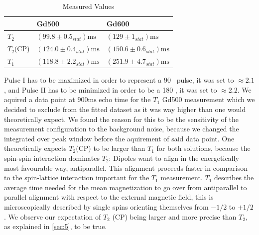 \begin{table}[h]
	\centering
	\begin{tabular}{lll}
		\toprule
		 & Gd500 & Gd600 \\
		\midrule
		$T_2$ & $\left(99.8 \pm 0.5_{stat}\right)\mathrm{ms}$ & $\left(129 \pm 1_{stat}\right)\mathrm{ms}$\\
		
		$T_2$(CP) & $\left(124.0 \pm 0.4_{stat}\right)\mathrm{ms}$ & $\left(150.6 \pm 0.6_{stat}\right)\mathrm{ms}$\\
		
		$T_1$   & $\left(118.8 \pm 2.2_{stat}\right)\mathrm{ms}$ &$ \left(251.9 \pm 4.7_{stat}\right)\mathrm{ms}$\\
		
		\bottomrule
	\end{tabular}
	\caption{Measured Values}
	\label{tab:1}
\end{table}
\noindent
Pulse I has to be maximized in order to represent a 90 \textdegree\, pulse, it was set to $\approx 2.1$, and Pulse II has to be minimized in order to be a 180 \textdegree, it was set to $\approx 2.2$.
We aquired a data point at $900 \mathrm{ms}$ echo time for the $T_1$ Gd500 measurement which we decided to exclude from the fitted dataset as it was way higher than one would theoretically expect. We found the reason for this to be the sensitivity of the measurement configuration to the background noise, because we changed the integrated over peak window before the aquirement of said data point.
One theoretically expects $T_2$(CP) to be larger than $T_1$ for both solutions,
because the spin-spin interaction dominates $T_2$: Dipoles want to align in the energetically most favourable way, antiparallel. This alignment proceeds faster in comparison to the spin-lattice interaction important for the $T_1$ measurement. $T_1$ describes the average time needed for the mean magnetization to go over from antiparallel to parallel alignment with respect to the external magnetic field, this is microscopically described by single spins orienting themselves from $-1/2$ to $+1/2$.\cite{manual} We observe our expectation of $T_2$ (CP) being larger and more precise than $T_2$, as explained in \ref{sec:5}, to be true.
